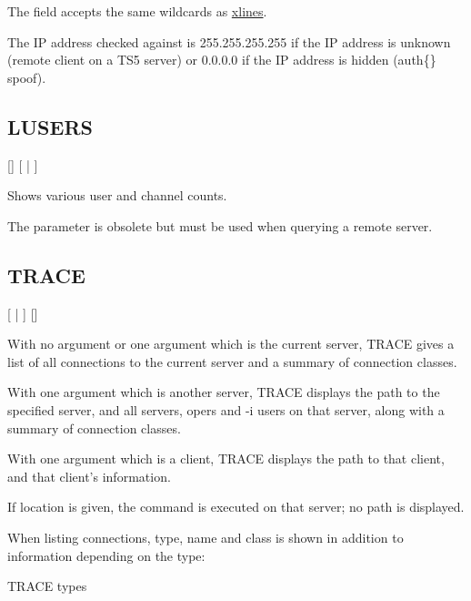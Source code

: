 	The  field accepts the same wildcards as
	\hyperref[XLINES]{xlines}.

	The IP address checked against is 255.255.255.255 if the IP address is
	unknown (remote client on a TS5 server) or 0.0.0.0 if the IP address is
	hidden (auth\{\} spoof).


\subsection{LUSERS}

    [] [ | ]

	Shows various user and channel counts.


	The  parameter is obsolete but must be used when
	querying a remote server.


\subsection{TRACE}

    [ | ] []

	With no argument or one argument which is the current server,
	TRACE gives a list of all connections to the current server
	and a summary of connection classes.


	With one argument which is another server, TRACE displays the path
	to the specified server, and all servers, opers and -{}i users
	on that server, along with a summary of connection classes.


	With one argument which is a client, TRACE displays the
	path to that client, and that client's information.


	If location is given, the command is executed on that server;
	no path is displayed.


	When listing connections, type, name and class is shown
	in addition to information depending on the type:


{\sc TRACE types}
\nopagebreak

